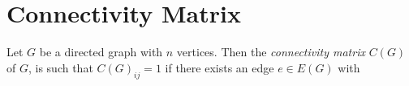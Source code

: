 \section{Connectivity Matrix}

\begin{definition}
Let $G$ be a directed graph with $n$ vertices. Then the
\textit{connectivity matrix} $C(G)$ of $G$, is such that $C(G)_{ij} =
1$ if there exists an edge $e \in E(G)$ with 
\end{definition}



% 





